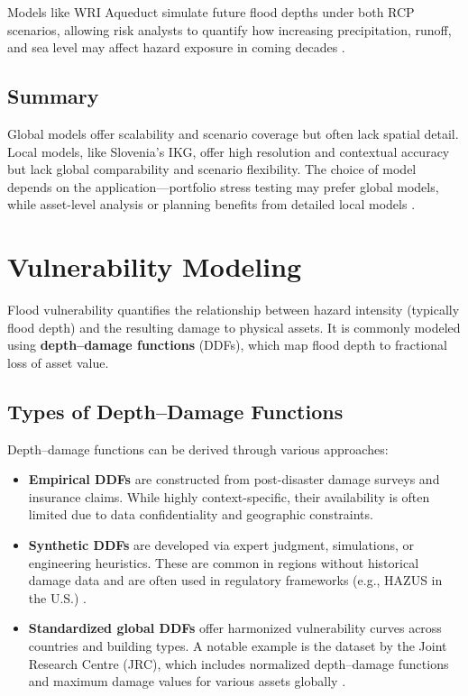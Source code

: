 Models like WRI Aqueduct simulate future flood depths under both RCP scenarios, allowing risk analysts to quantify how increasing precipitation, runoff, and sea level may affect hazard exposure in coming decades \cite{bavandi_physical_2022, ipcc2021}.

\subsection{Summary}

Global models offer scalability and scenario coverage but often lack spatial detail. Local models, like Slovenia’s IKG, offer high resolution and contextual accuracy but lack global comparability and scenario flexibility. The choice of model depends on the application—portfolio stress testing may prefer global models, while asset-level analysis or planning benefits from detailed local models \cite{huizinga_global_2017, ipcc2021}.


\section{Vulnerability Modeling}

Flood vulnerability quantifies the relationship between hazard intensity (typically flood depth) and the resulting damage to physical assets. It is commonly modeled using \textbf{depth--damage functions} (DDFs), which map flood depth to fractional loss of asset value.

\subsection{Types of Depth--Damage Functions}

Depth--damage functions can be derived through various approaches:

\begin{itemize}
    \item \textbf{Empirical DDFs} are constructed from post-disaster damage surveys and insurance claims. While highly context-specific, their availability is often limited due to data confidentiality and geographic constraints.
    
    \item \textbf{Synthetic DDFs} are developed via expert judgment, simulations, or engineering heuristics. These are common in regions without historical damage data and are often used in regulatory frameworks (e.g., HAZUS in the U.S.) \cite{scawthorn_hazus-mh_2006}.
    
    \item \textbf{Standardized global DDFs} offer harmonized vulnerability curves across countries and building types. A notable example is the dataset by the Joint Research Centre (JRC), which includes normalized depth--damage functions and maximum damage values for various assets globally \cite{huizinga_global_2017}.
\end{itemize}

